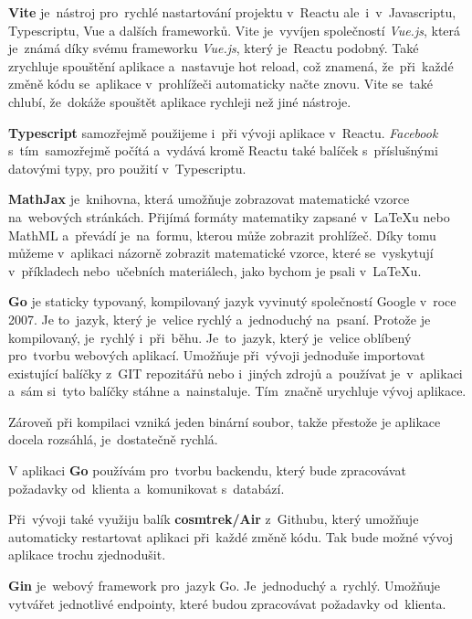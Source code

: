 \documentclass[14pt,a4paper]{article}
\begin{document}
            \textbf{Vite} je~nástroj pro~rychlé nastartování projektu v~Reactu ale~i~v~Javascriptu, Typescriptu, Vue a dalších frameworků.
            Vite je~vyvíjen společností \emph{Vue.js}, která je~známá díky svému frameworku \emph{Vue.js}, který je~Reactu podobný.
            Také zrychluje spouštění aplikace a~nastavuje hot reload, což znamená, že~při~každé změně kódu se~aplikace v~prohlížeči automaticky načte znovu.
            Vite se~také chlubí, že~dokáže spouštět aplikace rychleji než jiné nástroje.

            \textbf{Typescript} samozřejmě použijeme i~při vývoji aplikace v~Reactu. \emph{Facebook} s~tím~samozřejmě počítá a~vydává
            kromě Reactu také balíček s~příslušnými datovými typy, pro použití v~Typescriptu.
            
            \textbf{MathJax} je~knihovna, která umožňuje zobrazovat matematické vzorce na~webových stránkách.
            Přijímá formáty matematiky zapsané v~\LaTeX{u} nebo MathML a~převádí je~na~formu, kterou může zobrazit prohlížeč.
            Díky tomu můžeme v~aplikaci názorně zobrazit matematické vzorce, které se~vyskytují v~příkladech nebo~učebních materiálech,
            jako bychom je psali v~\LaTeX{u}.

            \textbf{Go} je staticky typovaný, kompilovaný jazyk vyvinutý společností Google v~roce 2007. Je to~jazyk, který je~velice rychlý a~jednoduchý na~psaní.
            Protože je kompilovaný, je~rychlý i~při~běhu. Je~to~jazyk, který je~velice oblíbený pro~tvorbu webových aplikací.
            Umožňuje při~vývoji jednoduše importovat existující balíčky z~GIT repozitářů nebo i~jiných zdrojů a~používat je~v~aplikaci a~sám
            si~tyto balíčky stáhne a~nainstaluje. Tím~značně urychluje vývoj aplikace.

            Zároveň při kompilaci vzniká jeden binární soubor, takže přestože je aplikace docela rozsáhlá, je~dostatečně rychlá.
            
            V aplikaci \textbf{Go} používám pro~tvorbu backendu, který bude zpracovávat požadavky od~klienta a~komunikovat s~databází.

            Při~vývoji také využiju balík \textbf{cosmtrek/Air} z~Githubu, který umožňuje automaticky restartovat aplikaci při~každé změně kódu.
            Tak bude možné vývoj aplikace trochu zjednodušit.

            \textbf{Gin} je~webový framework pro~jazyk Go. Je~jednoduchý a~rychlý. Umožňuje vytvářet jednotlivé endpointy,
            které budou zpracovávat požadavky od~klienta.
\end{document}
